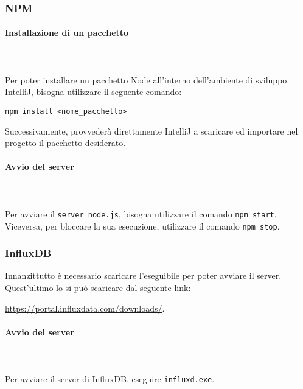 	\subsubsection{NPM}
	\paragraph*{Installazione di un pacchetto} \mbox{} \\ \mbox{} \\
	Per poter installare un pacchetto Node all'interno dell'ambiente di sviluppo IntelliJ, bisogna utilizzare il seguente comando:\\
	\centerline{\texttt{npm install <nome\_pacchetto>}}
	Successivamente, provvederà direttamente IntelliJ a scaricare ed importare nel progetto il pacchetto desiderato.
	
	\paragraph*{Avvio del server} \mbox{} \\ \mbox{} \\
	Per avviare il \texttt{server node.js}, bisogna utilizzare il comando \texttt{npm start}.\\
	Viceversa, per bloccare la sua esecuzione, utilizzare il comando \texttt{npm stop}.

	\subsubsection{InfluxDB}
	Innanzittutto è necessario scaricare l'eseguibile per poter avviare il server.
    Quest'ultimo lo si può scaricare dal seguente link:\\
	\centerline{\url{https://portal.influxdata.com/downloads/}.} 
    
	\paragraph*{Avvio del server} \mbox{} \\ \mbox{} \\
	Per avviare il server di InfluxDB, eseguire \texttt{influxd.exe}.